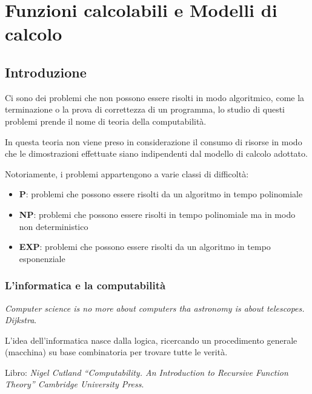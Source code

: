 \chapter{Funzioni calcolabili e Modelli di calcolo}
\section{Introduzione}\label{lezione-1---computabilituxe0-e-algoritmi}

Ci sono dei problemi che non possono essere risolti in modo algoritmico,
come la terminazione o la prova di correttezza di un programma, lo studio di questi problemi prende il nome di teoria della computabilità.

In questa teoria non viene preso in considerazione il consumo di
risorse in modo che le dimostrazioni effettuate siano indipendenti dal
modello di calcolo adottato.

Notoriamente, i problemi appartengono a varie classi di difficoltà:

\begin{itemize}
\item
  \textbf{P}: problemi che possono essere risolti da un algoritmo in
  tempo polinomiale
\item
  \textbf{NP}: problemi che possono essere risolti in tempo polinomiale
  ma in modo non deterministico
\item
  \textbf{EXP}: problemi che possono essere risolti da un algoritmo in
  tempo esponenziale
\end{itemize}

\subsection{L'informatica e la computabilità}\label{linformatica-e-la-computabilituxe0}

\emph{Computer science is no more about computers tha astronomy is about
telescopes. Dijkstra}.

L'idea dell'informatica nasce dalla logica, ricercando un procedimento
generale (macchina) su base combinatoria per trovare tutte le verità.

Libro: \emph{Nigel Cutland ``Computability. An Introduction to Recursive
Function Theory'' Cambridge University Press}.

